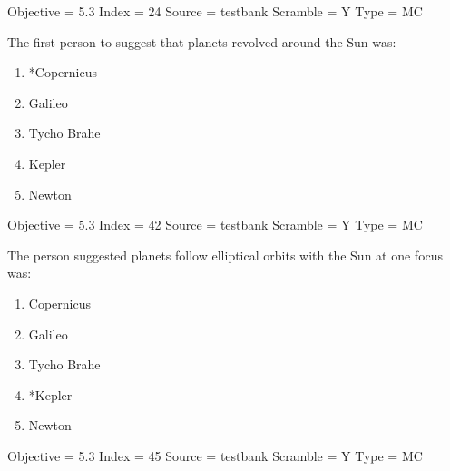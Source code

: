 \documentclass[11pt]{article}
\begin{document}
\begin{enumerate}
\begin{minipage}{\textwidth}
\begin{minipage}{\textwidth}
Objective = 5.3
Index = 24
Source = testbank
Scramble = Y
Type = MC
\end{minipage}
\end{minipage}
\vskip 0.20in

\begin{minipage}{\textwidth}
\begin{minipage}{\textwidth}
\item The first person to suggest that planets revolved around the Sun was:
\begin{multicols}{3}
\begin{enumerate} 
\setlength{\itemsep}{1pt} 
\setlength{\parskip}{0pt} 
\setlength{\parsep}{0pt}
\setlength{\multicolsep}{1pt} 
\item *Copernicus
\item Galileo
\item Tycho Brahe
\item Kepler
\item Newton
\end{enumerate} 
\vfill 
\end{multicols}

Objective = 5.3
Index = 42
Source = testbank
Scramble = Y
Type = MC
\end{minipage}
\end{minipage}
\vskip 0.20in

\begin{minipage}{\textwidth}
\begin{minipage}{\textwidth}
\item The person suggested planets follow elliptical orbits with the Sun at one focus was:
\begin{multicols}{3}
\begin{enumerate} 
\setlength{\itemsep}{1pt} 
\setlength{\parskip}{0pt} 
\setlength{\parsep}{0pt}
\setlength{\multicolsep}{1pt} 
\item Copernicus
\item Galileo
\item Tycho Brahe
\item *Kepler
\item Newton
\end{enumerate} 
\vfill 
\end{multicols}

Objective = 5.3
Index = 45
Source = testbank
Scramble = Y
Type = MC
\end{minipage}
\end{minipage}
\vskip 0.20in


\end{enumerate}
\end{document}
